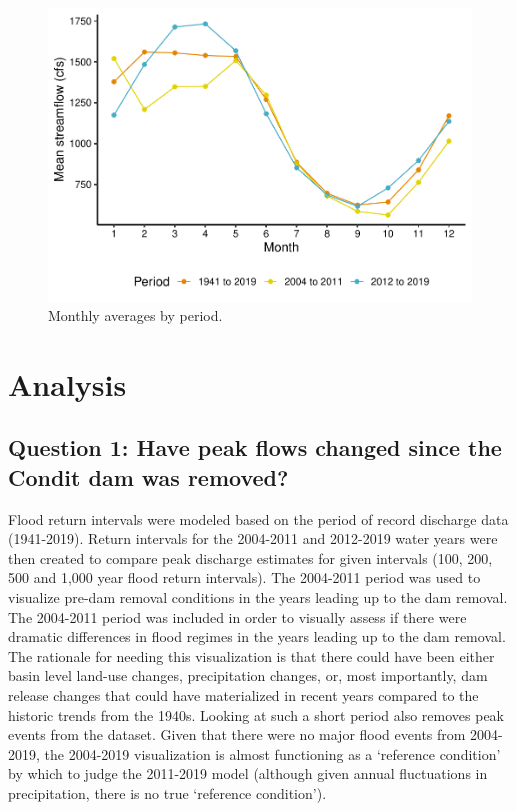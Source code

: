 \documentclass[
  12pt,
]{article}
\begin{document}
\newpage

\begin{figure}
\centering
\includegraphics{WhiteSalmon_WriteUp_files/figure-latex/fig4-1.pdf}
\caption{Monthly averages by period.}
\end{figure}

\newpage

\hypertarget{analysis}{%
\section{Analysis}\label{analysis}}

\hypertarget{question-1-have-peak-flows-changed-since-the-condit-dam-was-removed}{%
\subsection{Question 1: Have peak flows changed since the Condit dam was
removed?}\label{question-1-have-peak-flows-changed-since-the-condit-dam-was-removed}}

Flood return intervals were modeled based on the period of record
discharge data (1941-2019). Return intervals for the 2004-2011 and
2012-2019 water years were then created to compare peak discharge
estimates for given intervals (100, 200, 500 and 1,000 year flood return
intervals). The 2004-2011 period was used to visualize pre-dam removal
conditions in the years leading up to the dam removal. The 2004-2011
period was included in order to visually assess if there were dramatic
differences in flood regimes in the years leading up to the dam removal.
The rationale for needing this visualization is that there could have
been either basin level land-use changes, precipitation changes, or,
most importantly, dam release changes that could have materialized in
recent years compared to the historic trends from the 1940s. Looking at
such a short period also removes peak events from the dataset. Given
that there were no major flood events from 2004-2019, the 2004-2019
visualization is almost functioning as a `reference condition' by which
to judge the 2011-2019 model (although given annual fluctuations in
precipitation, there is no true `reference condition').
\end{document}
